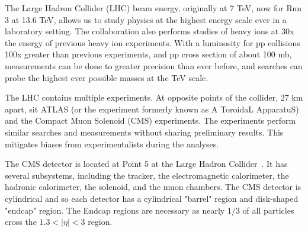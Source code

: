 The Large Hadron Collider (LHC) beam energy, originally at 7 TeV, now for Run 3 at 13.6 TeV, allows us to study physics at the highest energy scale ever in a laboratory setting. The collaboration also performs studies of heavy ions at 30x the energy of previous heavy ion experiments. With a luminosity for pp collisions 100x greater than previous experiments, and pp cross section of about 100 mb, measurements can be done to greater precision than ever before, and searches can probe the highest ever possible masses at the TeV scale.

The LHC contains multiple experiments. At opposite points of the collider, 27 km apart, sit ATLAS (or the experiment formerly known as A ToroidaL ApparatuS) and the Compact Muon Solenoid (CMS) experiments. The experiments perform similar searches and measurements without sharing preliminary results. This mitigates biases from experimentalists during the analyses.

The CMS detector is located at Point 5 at the Large Hadron Collider~\cite{CMSExperiment}. It has several subsystems, including the tracker, the electromagnetic calorimeter, the hadronic calorimeter, the solenoid, and the muon chambers. The CMS detector is cylindrical and so each detector has a cylindrical "barrel" region and disk-shaped "endcap" region. The Endcap regions are necessary as nearly $1/3$ of all particles cross the $1.3 < |\eta| < 3$ region.








